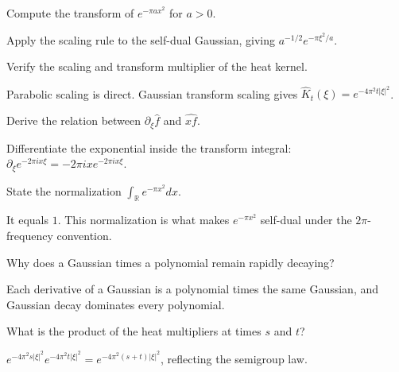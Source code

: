 \begin{problem}\label{prob:iii12-problem-02}
Compute the transform of \(e^{-\pi a x^2}\) for \(a>0\).
\end{problem}
\begin{solution}
Apply the scaling rule to the self-dual Gaussian, giving
\(a^{-1/2}e^{-\pi\xi^2/a}\).
\end{solution}

\begin{problem}\label{prob:iii12-problem-03}
Verify the scaling and transform multiplier of the heat kernel.
\end{problem}
\begin{solution}
Parabolic scaling is direct. Gaussian transform scaling gives
\(\widehat K_t(\xi)=e^{-4\pi^2t|\xi|^2}\).
\end{solution}

\begin{problem}\label{prob:iii12-problem-04}
Derive the relation between \(\partial_\xi\widehat f\) and \(\widehat{xf}\).
\end{problem}
\begin{solution}
Differentiate the exponential inside the transform integral:
\(\partial_\xi e^{-2\pi ix\xi}=-2\pi ix e^{-2\pi ix\xi}\).
\end{solution}

\begin{problem}\label{prob:iii12-problem-05}
State the normalization \(\int_{\mathbb R}e^{-\pi x^2}dx\).
\end{problem}
\begin{solution}
It equals \(1\). This normalization is what makes \(e^{-\pi x^2}\)
self-dual under the \(2\pi\)-frequency convention.
\end{solution}

\begin{problem}\label{prob:iii12-problem-06}
Why does a Gaussian times a polynomial remain rapidly decaying?
\end{problem}
\begin{solution}
Each derivative of a Gaussian is a polynomial times the same Gaussian, and
Gaussian decay dominates every polynomial.
\end{solution}

\begin{problem}\label{prob:iii12-problem-07}
What is the product of the heat multipliers at times \(s\) and \(t\)?
\end{problem}
\begin{solution}
\(e^{-4\pi^2s|\xi|^2}e^{-4\pi^2t|\xi|^2}
=e^{-4\pi^2(s+t)|\xi|^2}\), reflecting the semigroup law.
\end{solution}

